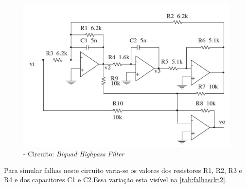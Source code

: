 \begin{enumerate}
    
\begin{figure}[H]
\begin{center}
\includegraphics[width=12cm]{./04_Cap4/figures/bickt.png}
\caption{\label{fig:Circuito2}- Circuito: {\textit{Biquad Highpass Filter}}}
\end{center}
\end{figure}

Para simular falhas neste circuito varia-se os valores dos resistores R1, R2, R3 e R4  e dos capacitores C1 e C2.Essa variação esta visível na \ref{tab:falhasckt2}. 


\end{enumerate}
